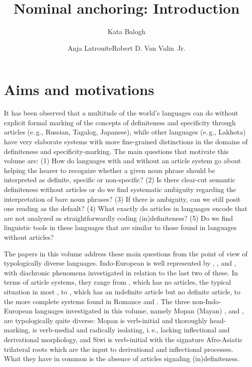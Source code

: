 \documentclass[output=paper]{langsci/langscibook}
\author{Kata Balogh\affiliation{Heinrich-Heine-Universität Düsseldorf}\and Anja Latrouite\affiliation{Heinrich-Heine-Universität Düsseldorf}\lastand  Robert D. Van Valin\quotesinglbase\ Jr.\affiliation{Heinrich-Heine-Universität Düsseldorf \& University at Buffalo}}
\title{Nominal anchoring: Introduction}
\begin{document}
\maketitle

\section{Aims and motivations} 
It has been observed that a multitude of the world's languages can do without explicit formal marking of the concepts of definiteness and specificity through articles (e.\,g., Russian, Tagalog, Japanese), while other languages (e.\,g., Lakhota) have very elaborate systems with more fine-grained distinctions in the domains of definiteness and specificity-marking. The main questions that motivate this volume are: (1) How do languages with and without an article system go about helping the hearer to recognize whether a given noun phrase should be interpreted as definite, specific or non-specific? (2) Is there clear-cut semantic definiteness without articles or do we find systematic ambiguity regarding the interpretation of bare noun phrases? (3) If there is ambiguity, can we still posit one reading as the default? (4) What exactly do articles in languages encode that are not analyzed as straightforwardly coding (in)definiteness? (5) Do we find linguistic tools in these languages that are similar to those found in languages without articles?

The papers in this volume address these main questions from the point of view of typologically diverse languages. Indo-European is well represented by , ,  and , with diachronic phenomena investigated in relation to the last two of these.  In terms of article systems, they range from , which has no articles, the typical situation in most , to , which has an indefinite article but no definite article, to the more complete systems found in Romance  and . The three non-Indo-European languages investigated in this volume, namely Mopan (Mayan) ,  and , are typologically quite diverse: Mopan  is verb-initial and thoroughly head-marking,  is verb-medial and radically isolating, i.\,e., lacking inflectional and derivational morphology, and Siwi  is verb-initial with the signature Afro-Asiatic  trilateral roots which are the input to derivational and inflectional processes. What they have in common is the absence of articles signaling (in)definiteness. 
\end{document}

